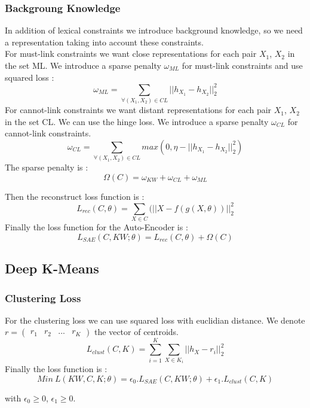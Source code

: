 \subsubsection{Backgroung Knowledge}
In addition of lexical constraints we introduce background knowledge, so we need
a representation taking into account these constraints.\\
For must-link constraints we want close representations for each pair $X_1$, $X_2$
in the set ML. We introduce a sparse penalty $\omega_{ML}$ for must-link
constraints and use squared loss :
\begin{equation}\label{eq:omegaML}
  \omega_{ML} = \sum_{\forall{(X_1,X_2)\in CL}} || h_{X_1} - h_{X_2} ||_2^2
\end{equation}
For cannot-link constraints we want distant representations for each pair $X_1$, $X_2$
in the set CL.
We can use the hinge loss.
We introduce a sparse penalty $\omega_{CL}$ for cannot-link constraints.
\begin{equation}\label{eq:omegaCL}
  \omega_{CL} = \sum_{\forall{(X_1,X_2)\in CL}} max(0,
  \eta - || h_{X_1} - h_{X_2} ||_2^2)
\end{equation}
The sparse penalty is :
\begin{equation}\label{eq:Sparse}
  \Omega(C) = \omega_{KW} + \omega_{CL} + \omega_{ML}  
\end{equation}

Then the reconstruct loss function is :
\begin{equation}\label{eq:AEDK}
  L_{rec}(C, \theta) = \sum_{X \in C}(||X - f(g(X, \theta))||_2^2
\end{equation}
Finally the loss function for the Auto-Encoder is :
\begin{equation}\label{eq:AE}
  L_{SAE}(C,KW; \theta) = L_{rec}(C, \theta) + \Omega(C)  
\end{equation}

\subsection{Deep K-Means}

\subsubsection{Clustering Loss}

For the clustering loss we can use squared loss with euclidian distance. We
denote $r = \begin{pmatrix} r_1 & r_2 & ... & r_K\end{pmatrix}$ the vector of
centroids.  
\begin{equation}\label{eq:loss_clust}
  L_{clust}(C,K) = \sum_{i=1}^K \sum_{X \in K_i} ||h_X - r_i ||_2^2 
\end{equation}
Finally the loss function is :
\begin{equation}\label{eq:loss_FINALE}
  Min~L(KW, C, K; \theta) = \epsilon_0.L_{SAE}(C, KW; \theta) 
  + \epsilon_1.L_{clust}(C,K)
\end{equation}

with $\epsilon_0 \geq 0$, $\epsilon_1 \geq 0$.

